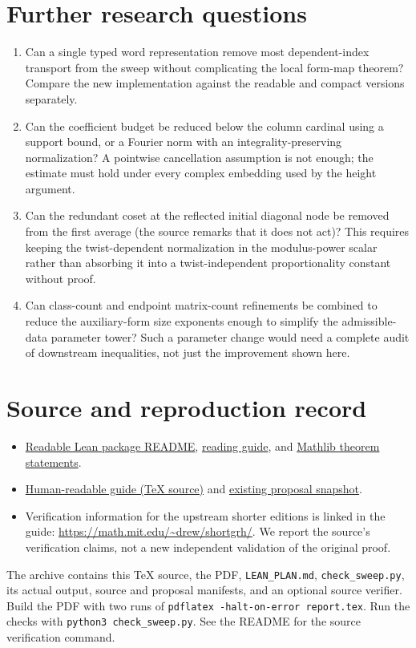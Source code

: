 \documentclass[11pt]{article}
\newcommand{\base}{https://github.com/VladimirReshetnikov/ProveIt/blob/835c3695d07c0f77060c5cc63f92eeb52a7d21c2/Analysis/GeneralizedRiemannHypothesis}
\begin{document}
\section{Further research questions}
\begin{enumerate}
\item Can a single typed word representation remove most dependent-index transport from the sweep without complicating the local form-map theorem? Compare the new implementation against the readable and compact versions separately.
\item Can the coefficient budget be reduced below the column cardinal using a support bound, or a Fourier norm with an integrality-preserving normalization? A pointwise cancellation assumption is not enough; the estimate must hold under every complex embedding used by the height argument.
\item Can the redundant coset at the reflected initial diagonal node be removed from the first average (the source remarks that it does not act)? This requires keeping the twist-dependent normalization in the modulus-power scalar rather than absorbing it into a twist-independent proportionality constant without proof.
\item Can class-count and endpoint matrix-count refinements be combined to reduce the auxiliary-form size exponents enough to simplify the admissible-data parameter tower? Such a parameter change would need a complete audit of downstream inequalities, not just the improvement shown here.
\end{enumerate}

\section*{Source and reproduction record}
\begin{itemize}
\item \href{\base/Lean/grh/README.md}{Readable Lean package README}, \href{\base/Lean/grh/GUIDE.md}{reading guide}, and \href{\base/Lean/grh/src/Statements.lean}{Mathlib theorem statements}.
\item \href{\base/docs/guide/theta_lifts_and_dirichlet_zeros.tex}{Human-readable guide (TeX source)} and \href{https://github.com/VladimirReshetnikov/ProveIt/tree/835c3695d07c0f77060c5cc63f92eeb52a7d21c2/Analysis/GeneralizedRiemannHypothesis/docs/proposals}{existing proposal snapshot}.
\item Verification information for the upstream shorter editions is linked in the guide: \url{https://math.mit.edu/~drew/shortgrh/}. We report the source's verification claims, not a new independent validation of the original proof.
\end{itemize}
The archive contains this TeX source, the PDF, \texttt{LEAN\_PLAN.md}, \texttt{check\_sweep.py}, its actual output, source and proposal manifests, and an optional source verifier. Build the PDF with two runs of \texttt{pdflatex -halt-on-error report.tex}. Run the checks with \texttt{python3 check\_sweep.py}. See the README for the source verification command.
\end{document}
